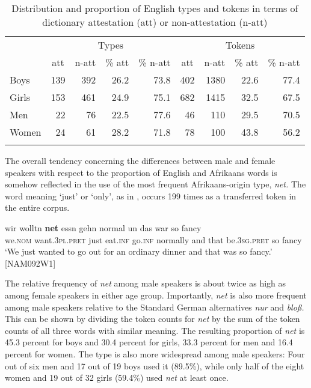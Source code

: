 \documentclass[output=paper]{langsci/langscibook}
\begin{document}
  
\begin{table}
\begin{tabular}{lrrrrrrrr}
\lsptoprule
& \multicolumn{4}{c}{Types} & \multicolumn{4}{c}{Tokens}\\\cmidrule(lr){2-5}\cmidrule(lr){6-9}
& \multicolumn{1}{c}{att} & \multicolumn{1}{c}{n-att} & \multicolumn{1}{c}{\% att} & \multicolumn{1}{c}{\% n-att} & \multicolumn{1}{c}{att} & \multicolumn{1}{c}{n-att} & \multicolumn{1}{c}{\% att} & \multicolumn{1}{c}{\% n-att}\\
\midrule
Boys & 139 & 392 & 26.2 & 73.8 & 402 & 1380 & 22.6 & 77.4\\
Girls & 153 & 461 & 24.9 & 75.1 & 682 & 1415 & 32.5 & 67.5\\
Men & 22 & 76 & 22.5 & 77.6 & 46 & 110 & 29.5 & 70.5\\
Women & 24 & 61 & 28.2 & 71.8 & 78 & 100 & 43.8 & 56.2\\
\lspbottomrule
\end{tabular}
\caption{Distribution and proportion of English types and tokens in terms of dictionary attestation (att) or non-attestation (n-att)\label{tab:bracke:8}}
\end{table}  

The overall tendency concerning the differences between male and female speakers with respect to the proportion of English and Afrikaans words is somehow reflected in the use of the most frequent Afrikaans-origin type, \textit{net.} The word meaning ‘just’ or ‘only’, as in , occurs 199 times as a transferred token in the entire corpus.

\ea
\label{ex:bracke:8}
\gll wir wolltn \textbf{net} essn gehn normal un das war so fancy\\
     we.\textsc{nom} want.\textsc{3pl.pret} just eat.\textsc{inf} go.\textsc{inf} normally and that be.\textsc{3sg.pret} so fancy\\
\glt `We just wanted to go out for an ordinary dinner and that was so fancy.' {[}NAM092W1{]}
\z

The relative frequency of \textit{net} among male speakers is about twice as high as among female speakers in either age group. Importantly, \textit{net} is also more frequent among male speakers relative to the Standard German alternatives \textit{nur} and \textit{bloß.} This can be shown by dividing the token counts for \textit{net} by the sum of the token counts of all three words with similar meaning. The resulting proportion of \textit{net} is 45.3 percent for boys and 30.4 percent for girls, 33.3 percent for men and 16.4 percent for women. The type is also more widespread among male speakers: Four out of six men and 17 out of 19 boys used it (89.5\%), while only half of the eight women and 19 out of 32 girls (59.4\%) used \textit{net} at least once.
\end{document}
